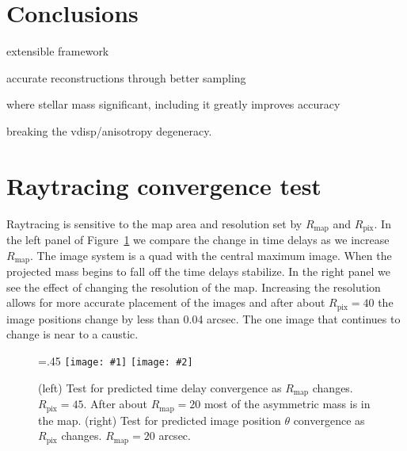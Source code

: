 \documentclass[galley]{mn2e}
\newcommand{\Rmap}{\ensuremath{R_\mathrm{map}}}
\newcommand{\Rpix}{\ensuremath{R_\mathrm{pix}}}
\newcommand{\figref}[1] {Figure~\ref{#1}}
\newcommand\plottwo[2]{{%
 \centering
 \leavevmode
 \columnwidth=.45\columnwidth
 \texttt{[image: \#1]}%
 \hfil
 \texttt{[image: \#2]}%
}}%
\begin{document}


\section{Conclusions}\label{sec:conclusions}

extensible framework                                                       

accurate reconstructions through better sampling                           

where stellar mass significant, including it greatly improves accuracy 

breaking the vdisp/anisotropy degeneracy.

\appendix

\section{Raytracing convergence test}
Raytracing is sensitive to the map area and resolution set by $\Rmap$ and
$\Rpix$.  In the left panel of \figref{raytracing convergence tests} we compare
the change in time delays as we increase $\Rmap$.  The image system is a quad
with the central maximum image. When the projected mass begins to fall off the
time delays stabilize. In the right panel we see the effect of changing the
resolution of the map.  Increasing the resolution allows for more accurate
placement of the images and after about $\Rpix=40$ the image positions change
by less than 0.04 arcsec. The one image that continues to change is near to a
caustic.  

\begin{figure}
\plottwo{tdconv_pr45.pdf}{imgpos_conv_mr20.pdf}
\caption{(left) Test for predicted time delay convergence as $\Rmap$ changes.
$\Rpix=45$. After about $\Rmap=20$ most of the asymmetric mass is in the map.
(right) Test for predicted image position $\theta$ convergence as $\Rpix$
changes. $\Rmap=20$ arcsec.}
\label{raytracing convergence tests}
\end{figure}
\end{document}
